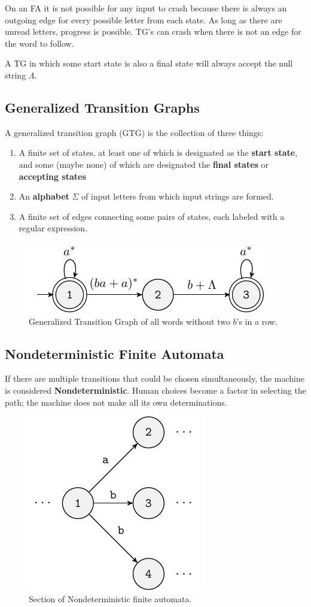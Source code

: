 On an FA it is not possible for any input to crash because there is always an outgoing edge for every possible letter from each state.
As long as there are unread letters, progress is possible.
TG's can crash when there is not an edge for the word to follow.


A TG in which some start state is also a final state will always accept the null string \(\Lambda\).

\subsection{Generalized Transition Graphs}

A generalized transition graph (GTG) is the collection of three things:
\begin{enumerate}
    \item A finite set of states, at least one of which is designated as the \textbf{start state}, and some (maybe none) of which are designated the \textbf{final states} or \textbf{accepting states}
    \item An \textbf{alphabet} \(\Sigma\) of input letters from which input strings are formed.
    \item A finite set of edges connecting some pairs of states, each labeled with a regular expression.
\end{enumerate}

\begin{figure}[h!]
    \centering
    \includegraphics[width=0.5\linewidth]{lectures/figures/6-2gtg.pdf}
    \caption{Generalized Transition Graph of all words without two \(b\)'s in a row.}
\end{figure}

\subsection{Nondeterministic Finite Automata}
If there are multiple transitions that could be chosen simultaneously, the machine is considered \textbf{Nondeterministic}.
Human choices become a factor in selecting the path; the machine does not make all its own determinations.
\begin{figure}[h!]
    \centering
    \includegraphics[width=0.4\linewidth]{lectures/figures/6-3nfa.pdf}
    \caption{Section of Nondeterministic finite automata.}
\end{figure}
